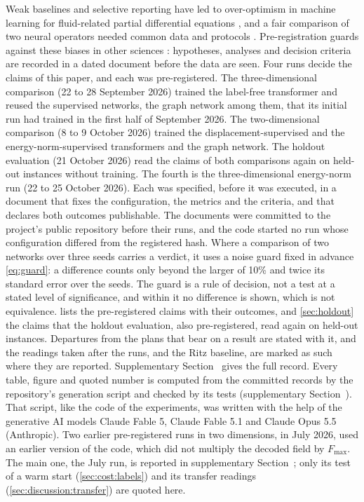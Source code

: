 Weak baselines and selective reporting have led to over-optimism in machine learning for
fluid-related partial differential equations \cite{McGreivy2024}, and a fair comparison of
two neural operators needed common data and protocols \cite{Lu2022Fair}. Pre-registration guards against these biases in other sciences \cite{Nosek2018}: hypotheses,
analyses and decision criteria are recorded in a dated document before the data are seen.
Four runs decide the claims of this paper, and each was pre-registered. The three-dimensional
comparison (22 to 28 September 2026) trained the label-free transformer and reused the
supervised networks, the graph network among them, that its initial run had trained in the
first half of September 2026. The two-dimensional comparison (8 to 9 October 2026) trained the
displacement-supervised and the energy-norm-supervised transformers and the graph network. The
holdout evaluation (21 October 2026) read the claims of both comparisons again on held-out
instances without training. The fourth is the three-dimensional energy-norm run (22 to 25
October 2026). Each was specified, before it was executed, in a
document that fixes the configuration, the metrics and the criteria, and that declares both outcomes publishable. The documents were committed to the project's public repository before
their runs, and the code started no run whose configuration differed from the registered
hash. Where a comparison of two networks over three seeds carries a verdict, it
uses a noise guard fixed in advance \eqref{eq:guard}: a difference counts only beyond the larger of 10\% and twice its standard error over the seeds. The guard is a rule of
decision, not a test at a stated level of significance, and within it no difference is shown,
which is not equivalence.  lists the pre-registered claims with their outcomes,
and \cref{sec:holdout} the claims that the holdout evaluation, also pre-registered, read again on held-out instances. Departures from the plans that bear on a result are stated
with it, and the readings taken after the runs, and the Ritz baseline, are marked as such
where they are reported. Supplementary Section~\SuppPrereg{} gives the full record. Every
table, figure and quoted number is computed from the committed records by the repository's
generation script and checked by its tests (supplementary Section~\SuppRepro{}). That script, like the code of the experiments, was written with the help of the generative AI
models Claude Fable 5, Claude Fable 5.1 and Claude Opus 5.5 (Anthropic). Two earlier
pre-registered runs in two dimensions, in July 2026, used an earlier version of the code,
which did not multiply the decoded field by $F_{\max}$. The main one, the July run, is
reported in supplementary Section~\SuppJuly{}; only its test of a warm start
(\cref{sec:cost:labels}) and its transfer readings (\cref{sec:discussion:transfer}) are quoted here.
